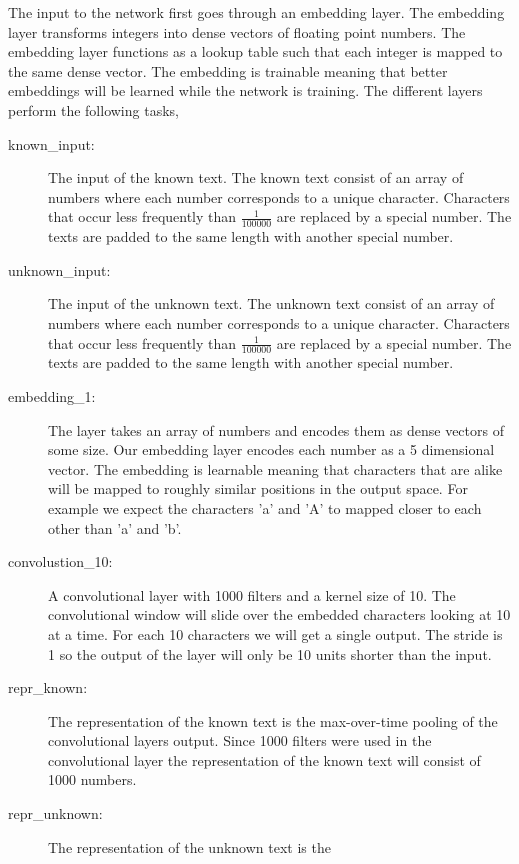 The input to the network first goes through an embedding layer. The embedding
layer transforms integers into dense vectors of floating point numbers. The
embedding layer functions as a lookup table such that each integer is mapped
to the same dense vector. The embedding is trainable meaning that better
embeddings will be learned while the network is training. The different layers
perform the following tasks,

\begin{description}
    \item[known\_input:] The input of the known text. The known text consist of
        an array of numbers where each number corresponds to a unique character.
        Characters that occur less frequently than $\frac{1}{100000}$ are
        replaced by a special number. The texts are padded to the same length
        with another special number.
    \item[unknown\_input:] The input of the unknown text. The unknown text
        consist of an array of numbers where each number corresponds to a unique
        character. Characters that occur less frequently than $\frac{1}{100000}$
        are replaced by a special number. The texts are padded to the same
        length with another special number.
    \item[embedding\_1:] The layer takes an array of numbers and encodes them as
        dense vectors of some size. Our embedding layer encodes each number as a
        5 dimensional vector. The embedding is learnable meaning that characters
        that are alike will be mapped to roughly similar positions in the output
        space. For example we expect the characters 'a' and 'A' to mapped closer
        to each other than 'a' and 'b'.
    \item[convolustion\_10:] A convolutional layer with 1000 filters and a
        kernel size of 10. The convolutional window will slide over the embedded
        characters looking at 10 at a time. For each 10 characters we will get a
        single output. The stride is 1 so the output of the layer will only be
        10 units shorter than the input.
    \item[repr\_known:] The representation of the known text is the
        max-over-time pooling of the convolutional layers output. Since 1000
        filters were used in the convolutional layer the representation of the
        known text will consist of 1000 numbers.
    \item[repr\_unknown:] The representation of the unknown text is the

\end{description}
